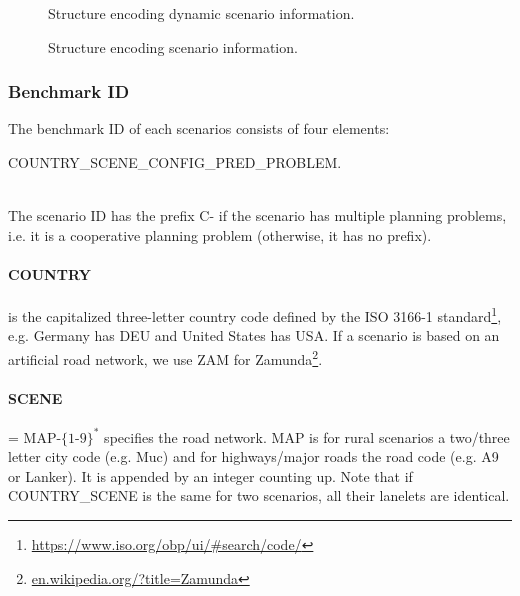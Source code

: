 \begin{figure}[!htpb]
	\small
	\caption{Structure encoding dynamic scenario information.}
	\label{fig:structureDynamic}
\end{figure}

\begin{figure}[!htpb]
	\small
	\caption{Structure encoding scenario information.}
	\label{fig:structureScenario}
\end{figure}
\newpage %


\subsubsection{Benchmark ID} \label{subsec:id}
The benchmark ID of each scenarios consists of four elements: \\
\centerline{COUNTRY\_SCENE\_CONFIG\_PRED\_PROBLEM.} \\
The scenario ID has the prefix C- if the scenario has multiple planning problems, i.e. it is a cooperative planning problem (otherwise, it has no prefix).

\paragraph{COUNTRY} is the capitalized three-letter country code defined by the ISO 3166-1 standard\footnote{\url{https://www.iso.org/obp/ui/\#search/code/}}, e.g. Germany has DEU and United States has USA.
If a scenario is based on an artificial road network, we use ZAM for Zamunda\footnote{\href{https://en.wikipedia.org/?title=Zamunda&redirect=no}{en.wikipedia.org/?title=Zamunda}}.

\paragraph{SCENE} = MAP-$\{1$-$9\}^*$ specifies the road network. MAP is for rural scenarios a two/three letter city code (e.g. Muc) and for highways/major roads the road code (e.g. A9 or Lanker). It is appended by an integer counting up. Note that if COUNTRY\_SCENE is the same for two scenarios, all their lanelets are identical.

